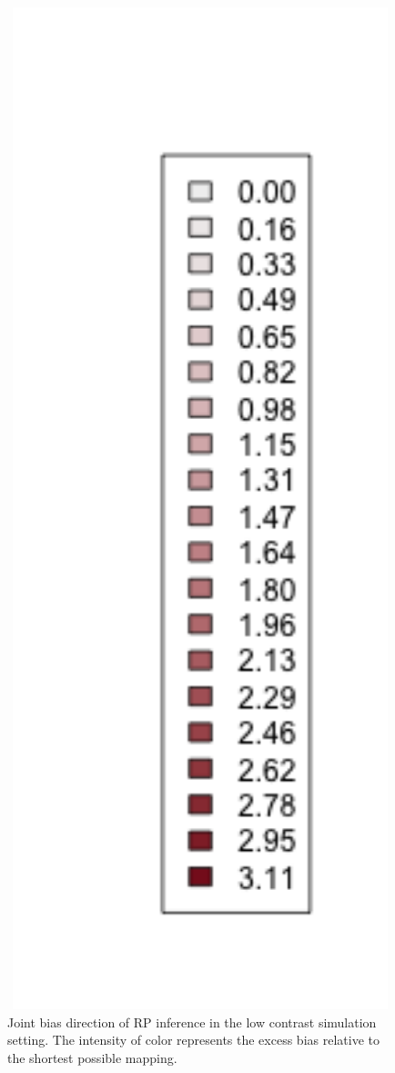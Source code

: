 \begin{figure}
\begin{minipage}[h!]{0.06\textwidth}
\includegraphics[width=1.7\textwidth]{../gpBias/legendSubSchnute.png}
\end{minipage}
\vspace{-0.5cm}
\caption{
Joint bias direction of RP inference in the low contrast simulation setting.
The intensity of color represents the excess bias relative
to the shortest possible mapping.
}
\label{bhLowArrows}
\end{figure}

